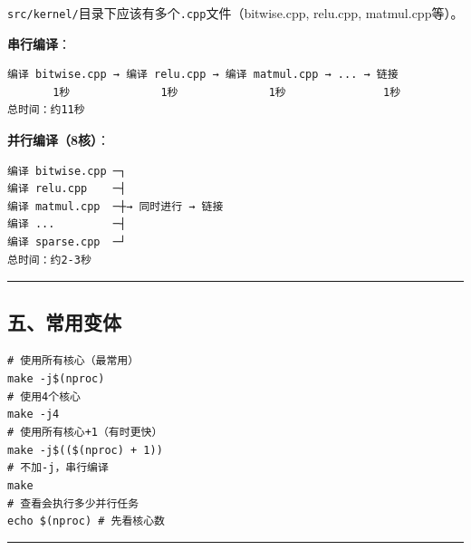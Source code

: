 \documentclass[11pt, a4paper]{article}
\begin{document}
\begin{aibox}
\texttt{src/kernel/}目录下应该有多个\texttt{.cpp}文件（bitwise.cpp, relu.cpp, matmul.cpp等）。

\textbf{串行编译}：
\begin{tcolorbox}[colback=white,colframe=gray!50!white,boxrule=0.5pt,arc=2pt,left=5pt,right=5pt,top=5pt,bottom=5pt]
\begin{verbatim}
编译 bitwise.cpp → 编译 relu.cpp → 编译 matmul.cpp → ... → 链接
       1秒              1秒              1秒               1秒
总时间：约11秒
\end{verbatim}
\end{tcolorbox}

\textbf{并行编译（8核）}：
\begin{tcolorbox}[colback=white,colframe=gray!50!white,boxrule=0.5pt,arc=2pt,left=5pt,right=5pt,top=5pt,bottom=5pt]
\begin{verbatim}
编译 bitwise.cpp ─┐
编译 relu.cpp    ─┤
编译 matmul.cpp  ─┼→ 同时进行 → 链接
编译 ...         ─┤
编译 sparse.cpp  ─┘
总时间：约2-3秒
\end{verbatim}
\end{tcolorbox}

\begin{center}\rule{\textwidth}{0.4pt}\end{center}

\subsection*{五、常用变体}

\begin{tcolorbox}[colback=white,colframe=gray!50!white,boxrule=0.5pt,arc=2pt,left=5pt,right=5pt,top=5pt,bottom=5pt]
\texttt{\# 使用所有核心（最常用）}\\
\texttt{make -j\$(nproc)}\\[0.5em]
\texttt{\# 使用4个核心}\\
\texttt{make -j4}\\[0.5em]
\texttt{\# 使用所有核心+1（有时更快）}\\
\texttt{make -j\$((\$(nproc) + 1))}\\[0.5em]
\texttt{\# 不加-j，串行编译}\\
\texttt{make}\\[0.5em]
\texttt{\# 查看会执行多少并行任务}\\
\texttt{echo \$(nproc)  \# 先看核心数}
\end{tcolorbox}

\begin{center}\rule{\textwidth}{0.4pt}\end{center}


\end{aibox}
\end{document}
